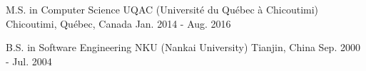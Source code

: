 

\begin{cventries}

  \cventry
    {M.S. in Computer Science} %
    {UQAC (Université du Québec à Chicoutimi)} %
    {Chicoutimi, Québec, Canada} %
    {Jan. 2014 - Aug. 2016} %
    {}

  \cventry
    {B.S. in Software Engineering} %
    {NKU (Nankai University)} %
    {Tianjin, China} %
    {Sep. 2000 - Jul. 2004} %
    {}

\end{cventries}
